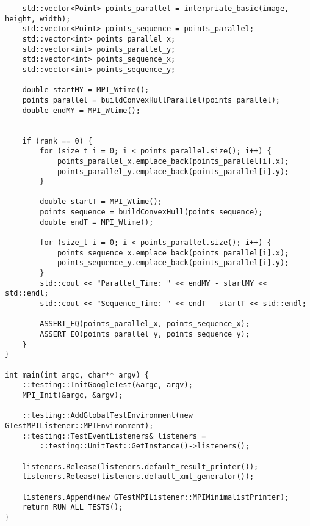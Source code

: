 \documentclass{report}
\begin{document}
\begin{lstlisting}
    std::vector<Point> points_parallel = interpriate_basic(image, height, width);
    std::vector<Point> points_sequence = points_parallel;
    std::vector<int> points_parallel_x;
    std::vector<int> points_parallel_y;
    std::vector<int> points_sequence_x;
    std::vector<int> points_sequence_y;

    double startMY = MPI_Wtime();
    points_parallel = buildConvexHullParallel(points_parallel);
    double endMY = MPI_Wtime();


    if (rank == 0) {
        for (size_t i = 0; i < points_parallel.size(); i++) {
            points_parallel_x.emplace_back(points_parallel[i].x);
            points_parallel_y.emplace_back(points_parallel[i].y);
        }

        double startT = MPI_Wtime();
        points_sequence = buildConvexHull(points_sequence);
        double endT = MPI_Wtime();

        for (size_t i = 0; i < points_parallel.size(); i++) {
            points_sequence_x.emplace_back(points_parallel[i].x);
            points_sequence_y.emplace_back(points_parallel[i].y);
        }
        std::cout << "Parallel_Time: " << endMY - startMY << std::endl;
        std::cout << "Sequence_Time: " << endT - startT << std::endl;

        ASSERT_EQ(points_parallel_x, points_sequence_x);
        ASSERT_EQ(points_parallel_y, points_sequence_y);
    }
}

int main(int argc, char** argv) {
    ::testing::InitGoogleTest(&argc, argv);
    MPI_Init(&argc, &argv);

    ::testing::AddGlobalTestEnvironment(new GTestMPIListener::MPIEnvironment);
    ::testing::TestEventListeners& listeners =
        ::testing::UnitTest::GetInstance()->listeners();

    listeners.Release(listeners.default_result_printer());
    listeners.Release(listeners.default_xml_generator());

    listeners.Append(new GTestMPIListener::MPIMinimalistPrinter);
    return RUN_ALL_TESTS();
}
\end{lstlisting}
\end{document}
